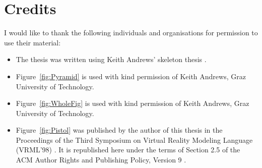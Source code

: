 %
%
% 
% 
% 


\chapter*{Credits}

I would like to thank the following individuals and organisations for
permission to use their material:
\begin{itemize}
\item The thesis was written using Keith Andrews' skeleton
  thesis \parencite{KeithThesis}.

\item Figure~\ref{fig:Pyramid} is used with kind permission of Keith
  Andrews, Graz University of Technology.

\item Figure~\ref{fig:WholeFig} is used with kind permission of Keith
  Andrews, Graz University of Technology.

\item Figure~\ref{fig:Pistol} was published by the author of this
  thesis in the Proceedings of the Third Symposium on Virtual Reality
  Modeling Language (VRML'98) \parencite{Andrews-VRwave}. It is
  republished here under the terms of Section 2.5 of the ACM Author
  Rights and Publishing Policy, Version 9 \parencite{ACM-Policy}.
\end{itemize}


